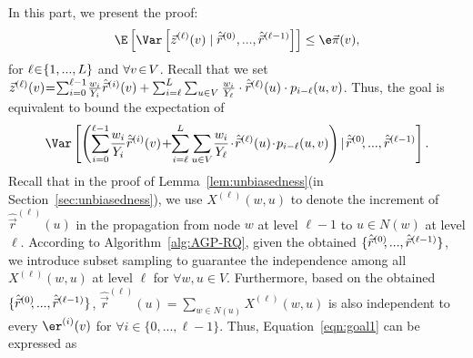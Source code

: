 In this part, we present the proof: 
\vspace{-1mm}
\begin{equation}\nonumber
\vspace{-1mm}
\E \left[\Var \left[\vec{z}^{(\ell)}(v)\mid \hat{\vec{r}}^{(0)},...,\hat{\vec{r}}^{(\ell-1)}\right]\right]\le \e \vec{\pi}(v), 
\end{equation}
for $\ell \hspace{-0.8mm}\in \hspace{-0.8mm} \{1,...,L\}$ and $\forall v \hspace{-0.5mm}\in \hspace{-0.5mm}V$. Recall that we set $ \vec{z}^{(\ell)}(v)\hspace{-0.8mm}=\hspace{-0.8mm}\sum_{i=0}^{\ell-1}\hspace{-0.5mm} \frac{w_i}{Y_i}\hat{\vec{r}}^{(i)}(v)+ \sum_{i=\ell}^{L}\sum_{u \in V} \frac{w_i}{Y_{\ell}} \cdot \hat{\vec{r}}^{(\ell)}(u)\cdot p_{i-\ell}(u,v)$. Thus, the goal is equivalent to bound the expectation of 
\vspace{-2mm}
\begin{equation}\label{eqn:goal1}
\vspace{-1mm}
\Var \left[\left(\sum_{i=0}^{\ell-1} \hspace{-0.5mm}\frac{w_i}{Y_i}\hat{\vec{r}}^{(i)}(v)\hspace{-0.5mm}+\hspace{-1mm}\sum_{i=\ell}^{L}\sum_{u \in V}\hspace{-0.5mm} \frac{w_i}{Y_{\ell}}\hspace{-0.5mm} \cdot \hspace{-0.5mm} \hat{\vec{r}}^{(\ell)}(u)\hspace{-0.5mm}\cdot \hspace{-0.5mm} p_{i-\ell}(u,v)\right)\hspace{-0.5mm} \mid \hspace{-0.5mm} \hat{\vec{r}}^{(0)}\hspace{-1mm},...,\hat{\vec{r}}^{(\ell-1)}\right]. 
\end{equation}
Recall that in the proof of Lemma~\ref{lem:unbiasedness}(in Section~\ref{sec:unbiasedness}), we use  $X^{(\ell)}(w,u)$ to denote the increment of $\hat{\vec{r}}^{(\ell)}(u)$ in the propagation from node $w$ at level $\ell-1$ to $u \in N(w)$ at level $\ell$. According to Algorithm~\ref{alg:AGP-RQ}, given the obtained $\{\hat{\vec{r}}^{(0)}\hspace{-1mm},...,\hat{\vec{r}}^{(\ell-1)}\}$, we introduce subset sampling to guarantee the independence among all $X^{(\ell)}(w,u)$ at level $\ell$ for $\forall w,u \in V$. Furthermore, based on the obtained $\{\hat{\vec{r}}^{(0)}\hspace{-1mm},...,\hat{\vec{r}}^{(\ell-1)}\}$, $\hat{\vec{r}}^{(\ell)}(u)=\sum_{w \in N(u)} X^{(\ell)}(w,u)$ is also independent to every $\er^{(i)}(v)$ for $\forall i \in \{0,...,\ell-1\}$. Thus, Equation~\eqref{eqn:goal1} can be expressed as
